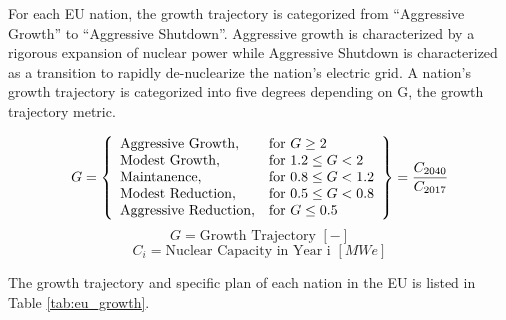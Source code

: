 For each \gls{EU} nation, the growth trajectory is categorized from
``Aggressive Growth'' to ``Aggressive Shutdown''. Aggressive growth is
characterized by a rigorous expansion of nuclear power while 
Aggressive Shutdown is characterized as a transition to rapidly
de-nuclearize the nation's electric grid. A nation's growth trajectory is
categorized into five degrees depending on G, the growth trajectory metric.
  
 \[
 G = \left\{\begin{array}{ll}
 \text{Aggressive Growth}, & \text{for } G \geq 2\\
 \text{Modest Growth}, & \text{for } 1.2 \leq G < 2\\
 \text{Maintanence}, & \text{for } 0.8 \leq G < 1.2 \\
 \text{Modest Reduction}, & \text{for } 0.5 \leq G< 0.8\\
 \text{Aggressive Reduction}, & \text{for } G \leq 0.5
 \end{array}\right\} = \frac{C_{2040}}{C_{2017}}\\\\
 \]
 \[
  G = \text{Growth Trajectory  } [-] 
 \]
 \[
 C_{i} = \text{Nuclear Capacity in Year i  } [MWe]
 \]
 
The growth trajectory and specific plan of each nation in the \gls{EU} 
is listed in Table \ref{tab:eu_growth}.

